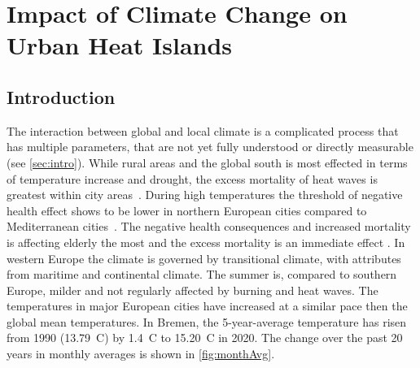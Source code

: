\documentclass[12pt,a4paper, english,twoside]{scrartcl}
\begin{document}
  \newpage
  \section{Impact of Climate Change on Urban Heat Islands}\label{sec:UHITempImp}
    \subsection{Introduction}
      The interaction between global and local climate is a complicated process that has multiple parameters, that are not yet fully understood or directly measurable (see \cref{sec:intro}).  
      While rural areas and the global south is most effected in terms of temperature increase and drought, the excess mortality of heat waves is greatest within city areas~\autocite{Gabriel2011}. During high temperatures the threshold of negative health effect shows to be lower in northern European cities compared to Mediterranean cities~\autocite{Baccini2008}. 
      The negative health consequences and increased mortality is affecting elderly the most and the excess mortality is an immediate effect \autocite{Baccini2008}. 
      In western Europe the climate is governed by transitional climate, with attributes from maritime and continental climate.
      The summer is, compared to southern Europe, milder and not regularly affected by burning and heat waves. 
      The temperatures in major European cities have increased at a similar pace then the global mean temperatures. 
      In Bremen, the 5-year-average temperature has risen from 1990 (13.79\textdegree\ C)  by 1.4\textdegree\ C to 15.20\textdegree\ C in 2020.
      The change over the past 20 years in monthly averages is shown in \cref{fig:monthAvg}.
\end{document}
